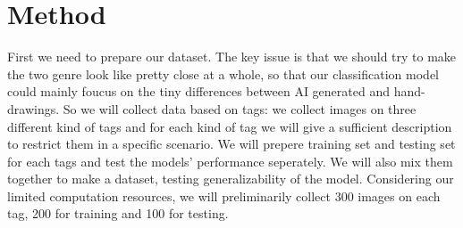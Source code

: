 \documentclass[10pt]{article}
\begin{document}
\section{Method}
First we need to prepare our dataset. The key issue is that we should try to make the two genre look like pretty close at a whole, so that our classification model
could mainly foucus on the tiny differences between AI generated and hand-drawings. So we will collect data based on tags: we collect images on three different kind of tags
and for each kind of tag we will give a sufficient description to restrict them in a specific scenario. We will prepere training set and testing set for each tags and test the
models' performance seperately. We will also mix them together to make a dataset, testing generalizability of the model. Considering our limited computation resources, we will preliminarily
collect 300 images on each tag, 200 for training and 100 for testing.

\vspace{10pt}
\end{document}
